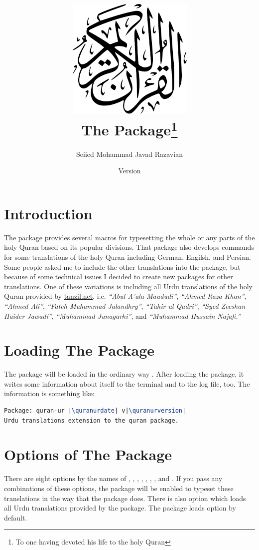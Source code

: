 \documentclass[a4paper]{ltxdoc}
\title{\includegraphics[scale=.3]{quran.png}\\
The \xpackage{quran-ur} Package\footnote{To one having devoted his life to the holy Quran}}
\author{Seiied Mohammad Javad Razavian\\\xemail{javadr@gmail.com}}
\date{\quranurdate\space Version \quranurversion}
\begin{document}
\maketitle

\tableofcontents

\vfill
\section{Introduction}
The  package provides several macros for
typesetting the whole or any parts of the holy Quran based on its popular divisions. 
That package also develops 
commands for some translations of the holy Quran including German, Engilsh, and Persian. 
Some people asked me to include the other translations into the  package, 
but because of some technical issues I decided to create new packages for other translations. 
One of these variations is  including all Urdu translations of the holy Quran 
provided by \url{tanzil.net}, i.e. 
\emph{``Abul A'ala Maududi''}, \emph{``Ahmed Raza Khan''}, 
\emph{``Ahmed Ali''}, \emph{``Fateh Muhammad Jalandhry''},
\emph{``Tahir ul Qadri''}, \emph{``Syed Zeeshan Haider Jawadi''}, 
\emph{``Muhammad Junagarhi''}, and \emph{``Muhammad Hussain Najafi.''}


\newpage
\section{Loading The Package}
The package will be loaded in the ordinary way
.
After loading the package, it writes some information about itself to the
terminal and to the log file, too. The information is something like:

\begin{lstlisting}[style=BashInputStyle, language=tex, escapechar={|}]
Package: quran-ur |\quranurdate| v|\quranurversion| 
Urdu translations extension to the quran package.
\end{lstlisting}


\section{Options of The Package}\label{sec:qurantypesetting}
There are eight options by the names of , , , 
, , , , and .
If you pass any combinations of these options, the package will be enabled to typeset these translations in the way that the  package does. 
There is also  option which loads all Urdu translations provided by the  package.
The package loads  option by default.
\end{document}
